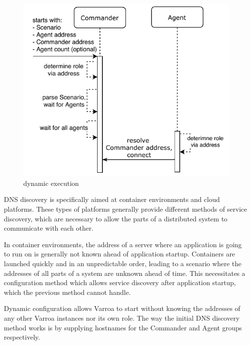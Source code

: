 \begin{figure}[h]
\begin{center}
\includegraphics[scale=1]{Resources/PDF/ExecutionDnsInit}
\caption{dynamic execution}
\label{pic:dynamicExecution}
\end{center}
\end{figure}

DNS discovery is specifically aimed at container environments and cloud platforms. These types of platforms generally provide different methods of service discovery, which are necessary to allow the parts of a distributed system to communicate with each other.

In container environments, the address of a server where an application is going to run on is generally not known ahead of application startup. Containers are launched quickly and in an unpredictable order, leading to a scenario where the addresses of all parts of a system are unknown ahead of time. This necessitates a configuration method which allows service discovery after application startup, which the previous method cannot handle.


Dynamic configuration allows Varroa to start without knowing the addresses of any other Varroa instances nor its own role. The way the initial DNS discovery method works is by supplying hostnames for the Commander and Agent groups respectively.


